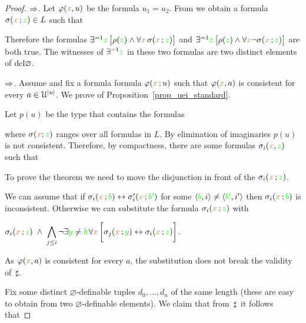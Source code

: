 \begin{proof}$\Rightarrow$.
Let $\varphi({\color{brown} x},u)$ be the formula $u_1=u_2$.
From  we obtain a formula $\sigma({\color{brown} x}\,;{\color{green} z})\in L$ such that 


Therefore the formulas $\exists^{=1} {\color{green} z}\,\big[\rho({\color{green} z})\wedge\forall {\color{brown}x}\,\sigma({\color{brown} x}\,;{\color{green} z})\big]$ and $\exists^{=1} {\color{green} z}\,\big[\rho({\color{green} z})\wedge\forall {\color{brown}x}\neg\sigma({\color{brown} x}\,;{\color{green} z})\big]$ are both true.
The witnesses of $\exists^{=1} {\color{green} z}$ in these two formulas are two distinct elements of ${\rm dcl}\varnothing$.

$\Rightarrow$.
Assume  and fix a formula formula $\varphi({\color{brown} x}\,;u)$ such that $\varphi({\color{brown} x},a)$ is consistent for every $a\in\EuScript U^{|u|}$.
We prove  of Proposition~\ref{prop_uei_standard}.

Let $p(u)$ be the type that contains the formulas


where $\sigma({\color{brown} x};{\color{green} z})$ ranges over all formulas in $L$.
By elimination of imaginaries $p(u)$ is not consistent.
Therefore, by compactness, there are some formulas $\sigma_i({\color{brown} x},{\color{green} z})$ such that


To prove the theorem we need to move the disjunction in front of the $\sigma_i({\color{brown} x}\,;{\color{green} z})$.

We can assume that if  $\sigma_i({\color{brown} x}\,;{\color{green} b})\leftrightarrow\sigma_i'({\color{brown} x}\,;{\color{green} b'})$ for some $\langle{\color{green}b},i\rangle\neq\langle{\color{green}b'},i'\rangle$ then $\sigma_i({\color{brown} x}\,;{\color{green} b})$ is inconsistent.
Otherwise we can substitute the formula $\sigma_i({\color{brown} x}\,;{\color{green} z})$ with  


\hfil$\displaystyle\sigma_i({\color{brown} x}\,;{\color{green} z}) \;\wedge\; \bigwedge_{j\le i}\neg\exists{\color{green}y}\neq{\color{green}b}\,\forall {\color{brown}x}\,\bigg[\sigma_j({\color{brown} x}\,;{\color{green} y})\leftrightarrow\sigma_i({\color{brown} x}\,;{\color{green} z})\bigg]$.


As $\varphi({\color{brown} x},a)$ is consistent for every $a$, the substitution does not break the validity of $\,\sharp$.

Fix some distinct $\varnothing$-definable tuples $d_0,\dots, d_n$ of the same length (these are easy to obtain from two $\varnothing$-definable elements).
We claim that from $\,\sharp\,$ it follows that


\end{proof}
